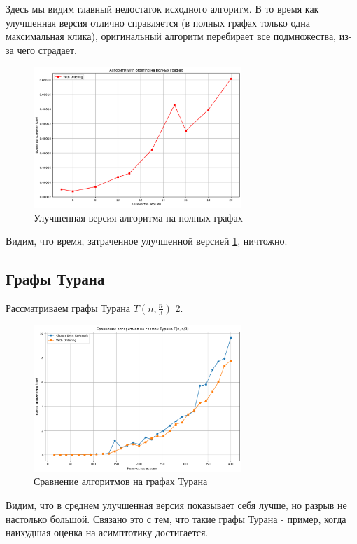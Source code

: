\documentclass{article}
\begin{document}
Здесь мы видим главный недостаток исходного алгоритм. В то время как улучшенная версия отлично справляется (в полных графах только одна максимальная клика), оригинальный алгоритм перебирает все подмножества, из-за чего страдает.

\begin{figure}[htbp]
  \centering
  \includegraphics[width=0.7\textwidth]{image/complete_ord.png}
  \caption{Улучшенная версия алгоритма на полных графах}
  \label{fig:rand5}
\end{figure}

Видим, что время, затраченное улучшенной версией \ref{fig:rand5}, ничтожно.

\subsection{Графы Турана}
Рассматриваем графы Турана $T(n, \frac{n}{3})$ \ref{fig:rand6}.

\begin{figure}[htbp]
  \centering
  \includegraphics[width=0.7\textwidth]{image/turan.png}
  \caption{Сравнение алгоритмов на графах Турана}
  \label{fig:rand6}
\end{figure}
\newline
Видим, что в среднем улучшенная версия показывает себя лучше, но разрыв не настолько большой. Связано это с тем, что такие графы Турана - пример, когда наихудшая оценка на асимптотику достигается.
\newpage
\end{document}

